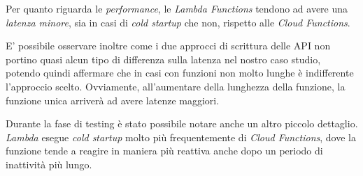 Per quanto riguarda le \textit{performance}, le \textit{Lambda Functions} tendono ad avere una \textit{latenza minore}, sia in casi di \textit{cold startup} che non, rispetto alle \textit{Cloud Functions}.

E' possibile osservare inoltre come i due approcci di scrittura delle API non portino quasi alcun tipo di differenza sulla latenza nel nostro caso studio, potendo quindi affermare che in casi con funzioni non molto lunghe è indifferente l'approccio scelto. Ovviamente, all'aumentare della lunghezza della funzione, la funzione unica arriverà ad avere latenze maggiori.

Durante la fase di testing è stato possibile notare anche un altro piccolo dettaglio. \textit{Lambda} esegue \textit{cold startup} molto più frequentemente di \textit{Cloud Functions}, dove la funzione tende a reagire in maniera più reattiva anche dopo un periodo di inattività più lungo.